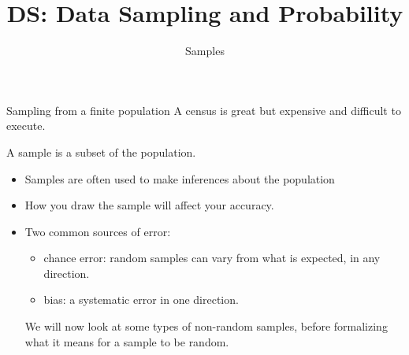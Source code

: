 \documentclass[aspectratio=169]{../latex_main/tntbeamer}  %
\title[Samples]{DS: Data Sampling and Probability}
\subtitle{Samples}
\begin{document}
	
	\maketitle
	
	\begin{frame}{Sampling from a finite population}
	    A census is great but expensive and difficult to execute.
     
	    \bigskip
	    \alert{A sample is a subset of the population.}
        \begin{itemize}
            \item Samples are often used to make \alert{inferences} about the population
            \item How you draw the sample will affect your accuracy.
            \item Two common sources of error:
            \begin{itemize}
                \item \alert{chance error}: random samples can vary from what is expected, in any direction.
                \item \alert{bias}: a systematic error in one direction.
            \end{itemize}
               \bigskip
               \bigskip
               We will now look at some types of \alert{non-random samples}, before formalizing what it means for a sample to be random.

        \end{itemize}
	    
	\end{frame}
	
\end{document}
